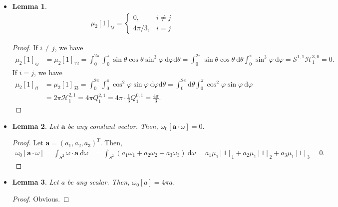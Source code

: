 \documentclass[10pt]{article}
\newtheorem{lemma}{Lemma}[section]
\newcommand{\dee}{\mathrm{d}}
\newcommand{\ve}[1]{\mathbf{#1}}
\begin{document}
\begin{itemize}
			\item \begin{lemma} \label{mu_2_const}
				\begin{align*}
					\mu_2[1]_{ij} = \begin{cases}
						0, & i \neq j\\
						4\pi/3, & i = j
					\end{cases}
				\end{align*}
			\end{lemma}
			\begin{proof}
				If $i \neq j$, we have
				\begin{align*}
					\mu_2[1]_{ij} 
					&= \mu_2[1]_{12} 
					= \int_{0}^{2\pi} \int_{0}^\pi \sin \theta \cos \theta \sin^3 \varphi\ \dee \varphi \dee\theta
					= \int_{0}^{2\pi} \sin\theta \cos\theta\ \dee\theta \int_{0}^\pi \sin^3\varphi\ \dee\varphi
					= \mathcal{S}^{1,1} \mathcal{H}_1^{3,0}
					= 0.
				\end{align*}
				If $i = j$, we have
				\begin{align*}
					\mu_2[1]_{ii} 
					&= \mu_2[1]_{33}
					= \int_{0}^{2\pi} \int_{0}^\pi \cos^2 \varphi \sin \varphi\ \dee \varphi \dee\theta
					= \int_{0}^{2\pi} \dee\theta \int_{0}^\pi \cos^2\varphi\sin\varphi\ \dee\varphi\\
					&= 2\pi \mathcal{H}_1^{2,1} = 4\pi Q_1^{2,1} = 4\pi \cdot \frac{1}{3} Q_1^{0,1} = \frac{4\pi}{3}.
				\end{align*}
			\end{proof}
			
		  \item \begin{lemma}
			Let $\ve a$ be any constant vector. Then, $\omega_0[\ve a \cdot \omega] = 0.$
	    \end{lemma}
	    \begin{proof}
	        Let $\ve a = (a_1, a_2, a_3)^T$. Then,
	        \begin{align*}
	          \omega_0[\ve a \cdot \omega] = \int_{S^2} \omega \cdot \ve a\ \dee \omega 
	          &= \int_{S^2} (a_1\omega_1 + a_2 \omega_2 + a_3 \omega_3)\ \dee \omega
	          = a_1 \mu_1 [1]_1 + a_2 \mu_1 [1]_2 + a_3 \mu_1[1]_3 = 0.
	        \end{align*}
	    \end{proof}
	    
	    \item \begin{lemma}
	      Let $a$ be any scalar. Then, $\omega_0[a] = 4\pi a$.
      \end{lemma}
      \begin{proof}
        Obvious.
      \end{proof}
      

\end{itemize}
\end{document}
